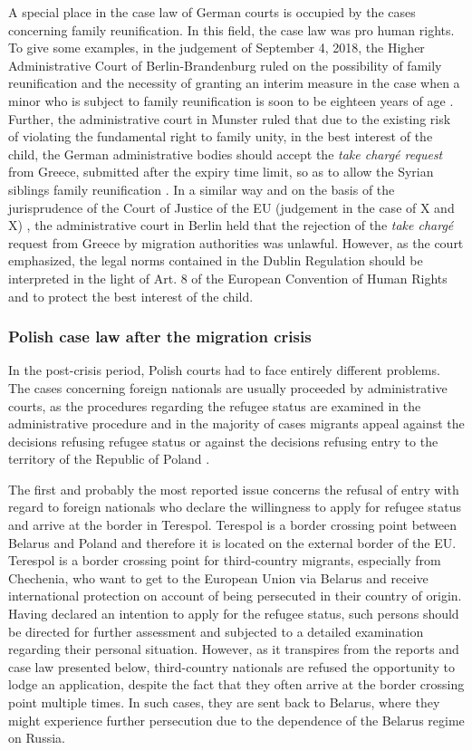 \documentclass[10pt,a4paper]{article}
\begin{document}
\begin{multicols}{2}
A special place in the case law of German courts is occupied by the cases concerning family reunification. In this field, the case law was pro human rights. To give some examples, in the judgement of September 4, 2018, the Higher Administrative Court of Berlin-Brandenburg ruled on the possibility of family reunification and the necessity of granting an interim measure in the case when a minor who is subject to family reunification is soon to be eighteen years of age \citep{R98}. Further, the administrative court in Munster ruled that due to the existing risk of violating the fundamental right to family unity, in the best interest of the child, the German administrative bodies should accept the \textit{take chargé request} from Greece, submitted after the expiry time limit, so as to allow the Syrian siblings family reunification \citep{R99}. In a similar way and on the basis of the jurisprudence of the Court of Justice of the EU (judgement in the case of X and X) \citep{R100}, the administrative court in Berlin held that the rejection of the \textit{take chargé} request from Greece by migration authorities was unlawful. However, as the court emphasized, the legal norms contained in the Dublin Regulation should be interpreted in the light of Art. 8 of the European Convention of Human Rights and to protect the best interest of the child.

\subsubsection{Polish case law after the migration crisis}

\noindent In the post-crisis period, Polish courts had to face entirely different problems. The cases concerning foreign nationals are usually proceeded by administrative courts, as the procedures regarding the refugee status are examined in the administrative procedure and in the majority of cases migrants appeal against the decisions refusing refugee status or against the decisions refusing entry to the territory of the Republic of Poland \citep{R101}.

The first and probably the most reported issue concerns the refusal of entry with regard to foreign nationals who declare the willingness to apply for refugee status and arrive at the border in Terespol. Terespol is a border crossing point between Belarus and Poland and therefore it is located on the external border of the EU. Terespol is a border crossing point for third-country migrants, especially from Chechenia, who want to get to the European Union via Belarus and receive international protection on account of being persecuted in their country of origin. Having declared an intention to apply for the refugee status, such persons should be directed for further assessment and subjected to a detailed examination regarding their personal situation. However, as it transpires from the reports and case law presented below, third-country nationals are refused the opportunity to lodge an application, despite the fact that they often arrive at the border crossing point multiple times. In such cases, they are sent back to Belarus, where they might experience further persecution due to the dependence of the Belarus regime on Russia.


\end{multicols}
\end{document}
